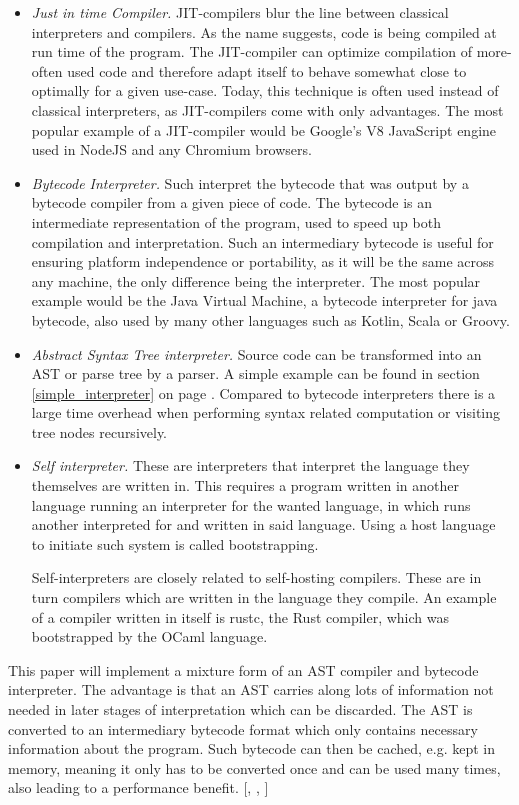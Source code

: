 \documentclass[12pt,a4paper]{article}
\begin{document}
\begin{itemize}
    \item \emph{Just in time Compiler.} JIT-compilers blur the line between
        classical interpreters and compilers. As the name suggests, code is
        being compiled at run time of the program. The JIT-compiler can optimize
        compilation of more-often used code and therefore adapt itself to
        behave somewhat close to optimally for a given use-case. Today, this 
        technique is often used instead of classical interpreters, as
        JIT-compilers come with only advantages. The most popular example of
        a JIT-compiler would be Google's V8 JavaScript engine used
        in NodeJS and any Chromium browsers.
    \item \emph{Bytecode Interpreter.} Such interpret the bytecode that was
        output by a bytecode compiler from a given piece of code. The bytecode
        is an intermediate representation of the program, used to speed up
        both compilation and interpretation. Such an intermediary bytecode is
        useful for ensuring platform independence or portability, as it will be
        the same across any machine, the only difference being the interpreter.
        The most popular example would be the Java Virtual Machine,
        a bytecode interpreter for java bytecode, also used by many other languages
        such as Kotlin, Scala or Groovy.
    \item \emph{Abstract Syntax Tree interpreter.} Source code can be
        transformed into an AST or parse tree by a parser. A simple example
        can be found in section \ref{simple_interpreter}
        on page \pageref{simple_interpreter}. Compared to bytecode interpreters
        there is a large time overhead when performing syntax related computation
        or visiting tree nodes recursively.
    \item \emph{Self interpreter.} These are interpreters that interpret the
        language they themselves are written in. This requires a program
        written in another language running an interpreter for the wanted
        language, in which runs another interpreted for and written in said
        language. Using a host language to initiate such system is called
        bootstrapping.

        Self-interpreters are closely related to self-hosting compilers. These
        are in turn compilers which are written in the language they compile.
        An example of a compiler written in itself is rustc, the Rust
        compiler, which was bootstrapped by the OCaml language.
\end{itemize}
This paper will implement a mixture form of an AST compiler and bytecode
interpreter. The advantage is that an AST carries along lots of information
not needed in later stages of interpretation which can be discarded. The AST
is converted to an intermediary bytecode format which only contains
necessary information about the program. Such bytecode can then be cached,
e.g. kept in memory, meaning it only has to be converted once and can be
used many times, also leading to a performance benefit.
[, , ]
\end{document}

